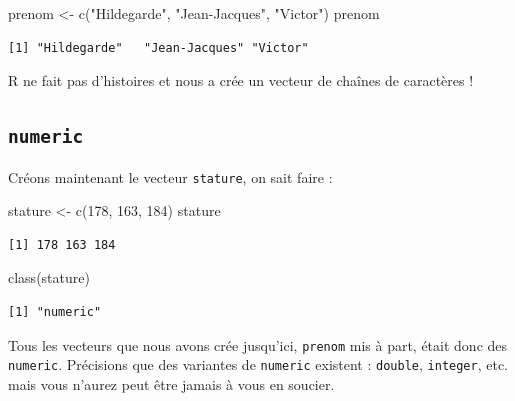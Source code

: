 \documentclass[
  letterpaper,
  DIV=11,
  numbers=noendperiod]{scrreprt}
\newenvironment{Shaded}{\begin{snugshade}}{\end{snugshade}}
\newcommand{\DecValTok}[1]{\textcolor[rgb]{0.68,0.00,0.00}{#1}}
\newcommand{\FunctionTok}[1]{\textcolor[rgb]{0.28,0.35,0.67}{#1}}
\newcommand{\NormalTok}[1]{\textcolor[rgb]{0.00,0.23,0.31}{#1}}
\newcommand{\OtherTok}[1]{\textcolor[rgb]{0.00,0.23,0.31}{#1}}
\newcommand{\StringTok}[1]{\textcolor[rgb]{0.13,0.47,0.30}{#1}}
\begin{document}
\begin{Shaded}
\begin{Highlighting}[]
\NormalTok{prenom }\OtherTok{\textless{}{-}} \FunctionTok{c}\NormalTok{(}\StringTok{"Hildegarde"}\NormalTok{, }\StringTok{"Jean{-}Jacques"}\NormalTok{, }\StringTok{"Victor"}\NormalTok{)}
\NormalTok{prenom}
\end{Highlighting}
\end{Shaded}

\begin{verbatim}
[1] "Hildegarde"   "Jean-Jacques" "Victor"      
\end{verbatim}

R ne fait pas d'histoires et nous a crée un vecteur de chaînes de
caractères !

\hypertarget{numeric}{%
\subsection{\texorpdfstring{\texttt{numeric}}{numeric}}\label{numeric}}

Créons maintenant le vecteur \texttt{stature}, on sait faire :

\begin{Shaded}
\begin{Highlighting}[]
\NormalTok{stature }\OtherTok{\textless{}{-}} \FunctionTok{c}\NormalTok{(}\DecValTok{178}\NormalTok{, }\DecValTok{163}\NormalTok{, }\DecValTok{184}\NormalTok{)}
\NormalTok{stature}
\end{Highlighting}
\end{Shaded}

\begin{verbatim}
[1] 178 163 184
\end{verbatim}

\begin{Shaded}
\begin{Highlighting}[]
\FunctionTok{class}\NormalTok{(stature)}
\end{Highlighting}
\end{Shaded}

\begin{verbatim}
[1] "numeric"
\end{verbatim}

Tous les vecteurs que nous avons crée jusqu'ici, \texttt{prenom} mis à
part, était donc des \texttt{numeric}. Précisions que des variantes de
\texttt{numeric} existent : \texttt{double}, \texttt{integer}, etc. mais
vous n'aurez peut être jamais à vous en soucier.
\end{document}
